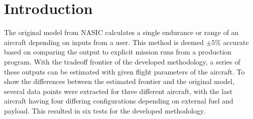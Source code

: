 \section{Introduction}
The original model from NASIC calculates a single endurance or range of an aircraft depending on inputs from a user. This method is deemed $\pm 5\%$ accurate based on comparing the output to explicit mission runs from a production program. With the tradeoff frontier of the developed methodology, a series of these outputs can be estimated with given flight parameters of the aircraft. To show the differences between the estimated frontier and the original model, several data points were extracted for three different aircraft, with the last aircraft having four differing configurations depending on external fuel and payload. This resulted in six tests for the developed methodology.\par
